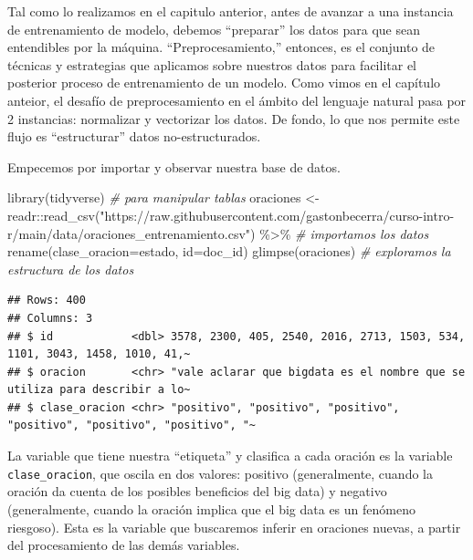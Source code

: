 \documentclass[
]{book}
\newenvironment{Shaded}{\begin{snugshade}}{\end{snugshade}}
\newcommand{\AttributeTok}[1]{\textcolor[rgb]{0.77,0.63,0.00}{#1}}
\newcommand{\CommentTok}[1]{\textcolor[rgb]{0.56,0.35,0.01}{\textit{#1}}}
\newcommand{\FunctionTok}[1]{\textcolor[rgb]{0.00,0.00,0.00}{#1}}
\newcommand{\NormalTok}[1]{#1}
\newcommand{\OtherTok}[1]{\textcolor[rgb]{0.56,0.35,0.01}{#1}}
\newcommand{\SpecialCharTok}[1]{\textcolor[rgb]{0.00,0.00,0.00}{#1}}
\newcommand{\StringTok}[1]{\textcolor[rgb]{0.31,0.60,0.02}{#1}}
\begin{document}
Tal como lo realizamos en el capitulo anterior, antes de avanzar a una instancia de entrenamiento de modelo, debemos ``preparar'' los datos para que sean entendibles por la máquina. ``Preprocesamiento,'' entonces, es el conjunto de técnicas y estrategias que aplicamos sobre nuestros datos para facilitar el posterior proceso de entrenamiento de un modelo. Como vimos en el capítulo anteior, el desafío de preprocesamiento en el ámbito del lenguaje natural pasa por 2 instancias: normalizar y vectorizar los datos. De fondo, lo que nos permite este flujo es ``estructurar'' datos no-estructurados.

Empecemos por importar y observar nuestra base de datos.

\begin{Shaded}
\begin{Highlighting}[]
\FunctionTok{library}\NormalTok{(tidyverse) }\CommentTok{\# para manipular tablas}
\NormalTok{oraciones }\OtherTok{\textless{}{-}}\NormalTok{ readr}\SpecialCharTok{::}\FunctionTok{read\_csv}\NormalTok{(}\StringTok{"https://raw.githubusercontent.com/gastonbecerra/curso{-}intro{-}r/main/data/oraciones\_entrenamiento.csv"}\NormalTok{) }\SpecialCharTok{\%\textgreater{}\%} \CommentTok{\# importamos los datos}
  \FunctionTok{rename}\NormalTok{(}\AttributeTok{clase\_oracion=}\NormalTok{estado, }\AttributeTok{id=}\NormalTok{doc\_id) }
\FunctionTok{glimpse}\NormalTok{(oraciones) }\CommentTok{\# exploramos la estructura de los datos}
\end{Highlighting}
\end{Shaded}

\begin{verbatim}
## Rows: 400
## Columns: 3
## $ id            <dbl> 3578, 2300, 405, 2540, 2016, 2713, 1503, 534, 1101, 3043, 1458, 1010, 41,~
## $ oracion       <chr> "vale aclarar que bigdata es el nombre que se utiliza para describir a lo~
## $ clase_oracion <chr> "positivo", "positivo", "positivo", "positivo", "positivo", "positivo", "~
\end{verbatim}

La variable que tiene nuestra ``etiqueta'' y clasifica a cada oración es la variable \texttt{clase\_oracion}, que oscila en dos valores: positivo (generalmente, cuando la oración da cuenta de los posibles beneficios del big data) y negativo (generalmente, cuando la oración implica que el big data es un fenómeno riesgoso). Esta es la variable que buscaremos inferir en oraciones nuevas, a partir del procesamiento de las demás variables.
\end{document}
